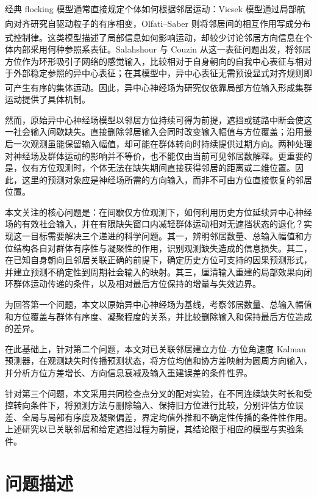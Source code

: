 \documentclass[UTF8,fontset=windows,11pt]{ctexart}
\newcommand{\upcite}[1]{\textsuperscript{\cite{#1}}}
\begin{document}
经典 flocking 模型通常直接规定个体如何根据邻居运动：Vicsek 模型通过局部航向对齐研究自驱动粒子的有序相变\upcite{Vicsek1995}，Olfati--Saber 则将邻居间的相互作用写成分布式控制律\upcite{OlfatiSaber2006}。这类模型描述了局部信息如何影响运动，却较少讨论邻居方向信息在个体内部采用何种参照系表征。Salahshour 与 Couzin 从这一表征问题出发，将邻居方位作为环形吸引子网络的感觉输入，比较相对于自身朝向的自我中心表征与相对于外部稳定参照的异中心表征；在其模型中，异中心表征无需预设显式对齐规则即可产生有序的集体运动\upcite{Salahshour2025}。因此，异中心神经场为研究仅依靠局部方位输入形成集群运动提供了具体机制。

然而，原始异中心神经场模型以邻居方位持续可得为前提，遮挡或链路中断会使这一社会输入间歇缺失。直接删除邻居输入会同时改变输入幅值与方位覆盖；沿用最后一次观测虽能保留输入幅值，却可能在群体转向时持续提供过期方向。两种处理对神经场及群体运动的影响并不等价，也不能仅由当前可见邻居数解释。更重要的是，仅有方位观测时，个体无法在缺失期间直接获得邻居的距离或二维位置。因此，这里的预测对象应是神经场所需的方向输入，而非不可由方位直接恢复的邻居位置。

本文关注的核心问题是：在间歇仅方位观测下，如何利用历史方位延续异中心神经场的有效社会输入，并在有限缺失窗口内减轻群体运动相对无遮挡状态的退化？实现这一目标需要解决三个递进的科学问题。其一，辨明邻居数量、总输入幅值和方位结构各自对群体有序性与凝聚性的作用，识别观测缺失造成的信息损失。其二，在已知自身朝向且邻居关联正确的前提下，确定历史方位可支持的因果预测形式，并建立预测不确定性到周期社会输入的映射。其三，厘清输入重建的局部效果向闭环群体运动传递的条件，以及相对最后方位保持的增量与失效边界。

为回答第一个问题，本文以原始异中心神经场为基线，考察邻居数量、总输入幅值和方位覆盖与群体有序度、凝聚程度的关系，并比较删除输入和保持最后方位造成的差异。

在此基础上，针对第二个问题，本文对已关联邻居建立方位--方位角速度 Kalman 预测器，在观测缺失时传播预测状态，将方位均值和协方差映射为圆周方向输入，并分析方位方差增长、方向信息衰减及输入重建误差的条件性界。

针对第三个问题，本文采用共同检查点分叉的配对实验，在不同连续缺失时长和受控转向条件下，将预测方法与删除输入、保持旧方位进行比较，分别评估方位误差、全局与局部有序度及凝聚偏差，界定均值外推和不确定性传播的条件性作用。上述研究以已关联邻居和给定遮挡过程为前提，其结论限于相应的模型与实验条件。
\clearpage

\section{问题描述}
\end{document}
